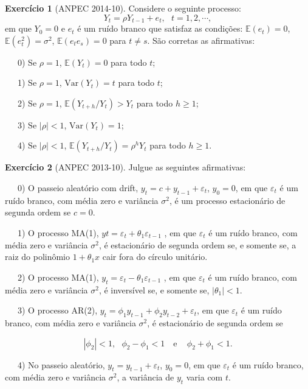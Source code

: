 \documentclass[
]{book}
\theoremstyle{definition}
\theoremstyle{definition}
\theoremstyle{definition}
\newtheorem{exercise}{Exercício}[chapter]
\theoremstyle{remark}
\begin{document}
\begin{exercise}[ANPEC 2014-10]
\protect\hypertarget{exr:a1410}{}{\label{exr:a1410} {} }Considere o seguinte processo:
\[Y_t=\rho Y_{t-1}+e_t,\,\,\,\, t=1,2,\cdots,\]
em que \(Y_0=0\) e \(e_t\) é um ruído branco que satisfaz as condições: \(\mathbb{E}(e_t)=0\), \(\mathbb{E}(e_t^2)=\sigma^2\), \(\mathbb{E}(e_te_s)=0\)
para \(t\neq s\).
São corretas as afirmativas:

~~~0) Se \(\rho=1\), \(\mathbb{E}(Y_t)=0\) para todo \(t\);

~~~1) Se \(\rho=1\), \(\mbox{Var}(Y_t)= t\) para todo \(t\);

~~~2) Se \(\rho=1\), \(\mathbb{E}(Y_{t+h}/Y_t)>Y_t\) para todo \(h\geq 1\);

~~~3) Se \(|\rho|<1\), \(\mbox{Var}(Y_t)= 1\);

~~~4) Se \(|\rho|<1\), \(\mathbb{E}(Y_{t+h}/Y_t)= \rho^h Y_t\) para todo \(h\geq 1\).
\end{exercise}

\begin{exercise}[ANPEC 2013-10]
\protect\hypertarget{exr:a1310}{}{\label{exr:a1310} {} }Julgue as seguintes afirmativas:

~~~0) O passeio aleatório com drift, \(y_t = c + y_{t-1} + \varepsilon_t\), \(y_0 = 0\), em que \(\varepsilon_t\) é um ruído branco, com média zero e variância \(\sigma^2\), é um processo estacionário de segunda ordem se \(c = 0\).

~~~1) O processo MA(1), \(yt = \varepsilon_t + \theta_1 \varepsilon_{t-1}\) , em que \(\varepsilon_t\) é um ruído branco, com média zero e variância \(\sigma^2\), é estacionário de segunda ordem se, e somente se, a raiz do polinômio \(1 + \theta_1x\) cair fora do círculo unitário.

~~~2) O processo MA(1), \(y_t = \varepsilon_t -\theta_1 \varepsilon_{t-1}\) , em que \(\varepsilon_t\) é um ruído branco, com média zero e variância \(\sigma^2\), é inversível se, e somente se, \(|\theta_1| < 1\).

~~~3) O processo AR(2), \(y_t = \phi_1y_{t-1} + \phi_2y_{t-2} + \varepsilon_t\), em que \(\varepsilon_t\) é um ruído branco, com média zero e variância \(\sigma^2\), é estacionário de segunda ordem se

\[|\phi_2| < 1,\,\,\,\, \phi_2 - \phi_1 < 1\,\,\,\,\mbox{ e }\,\,\,\,\, \phi_2 + \phi_1 < 1.\]

~~~4) No passeio aleatório, \(y_t = y_{t-1} + \varepsilon_t\), \(y_0 = 0\), em que \(\varepsilon_t\) é um ruído branco, com média zero e variância \(\sigma^2\), a variância de \(y_t\) varia com \(t\).
\end{exercise}
\end{document}
